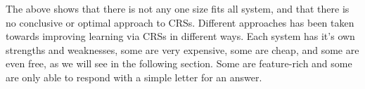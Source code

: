 The above shows that there is not any one size fits all system, and that there is no conclusive or optimal approach to CRSs. Different approaches has been taken towards improving learning via CRSs in different ways. Each system has it's own strengths and weaknesses, some are very expensive, some are cheap, and some are even free, as we will see in the following section. Some are feature-rich and some are only able to respond with a simple letter for an answer.

